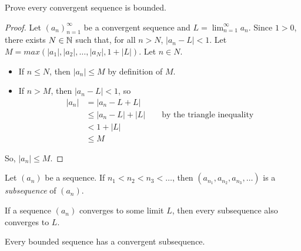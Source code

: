 \begin{example}
Prove every convergent sequence is bounded.
\end{example}
\begin{proof}
Let $(a_n)_{n=1}^\infty$ be a convergent sequence and $L = \lim_{n=1}^\infty a_n$. Since $1>0$, there exists $N\in \mathbb{N}$ such that, for all $n>N$, $|a_n-L|<1$. Let $M=max(|a_1|,|a_2|,\dots,|a_N|, 1+|L|)$. Let $n\in N$. 
\begin{itemize}
    \item If $n\leq N$, then $|a_n| \leq M$ by definition of $M$.
    \item If $n>M$, then $|a_n-L|<1$, so
    \begin{align*}
        |a_n| &= |a_n-L+L|\\
        &\leq |a_n-L|+|L| \quad\quad \text{by the triangle inequality}\\
        &< 1+|L|\\
        &\leq M
    \end{align*}
\end{itemize}
So, $|a_n| \leq M$.
\end{proof}

\begin{definition}[Subsequence]
Let $(a_n)$ be a sequence. If $n_1 < n_2 < n_3 < \dots$, then $(a_{n_1}, a_{n_2}, a_{n_3}, \dots)$ is a \textit{subsequence} of $(a_n)$.
\end{definition}

\begin{proposition}
If a sequence $(a_n)$ converges to some limit $L$, then every subsequence also converges to $L$.
\end{proposition}

\begin{theorem}
Every bounded sequence has a convergent subsequence.
\end{theorem}